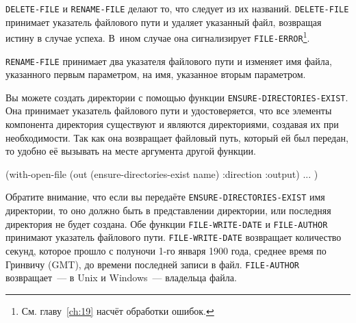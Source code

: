 \lstinline{DELETE-FILE} и \lstinline{RENAME-FILE} делают то, что следует из их
названий. \lstinline{DELETE-FILE} принимает указатель файлового пути и удаляет указанный файл,
возвращая истину в случае успеха. В~ином случае она сигнализирует
\lstinline{FILE-ERROR}\footnote{См. главу~\ref{ch:19} насчёт обработки ошибок.}\hspace{\footnotenegspace}.

\lstinline{RENAME-FILE} принимает два указателя файлового пути и изменяет имя файла, указанного
первым параметром, на имя, указанное вторым параметром.

Вы можете создать директории с помощью функции \lstinline{ENSURE-DIRECTORIES-EXIST}. Она
принимает указатель файлового пути и удостоверяется, что все элементы компонента
директория существуют и являются директориями, создавая их при необходимости. Так как она
возвращает файловый путь, который ей был передан, то удобно её вызывать на месте аргумента
другой функции.

\begin{myverb}
(with-open-file (out (ensure-directories-exist name) :direction :output) 
   ... 
   ) 
\end{myverb}

Обратите внимание, что если вы передаёте \lstinline{ENSURE-DIRECTORIES-EXIST} имя директории,
то оно должно быть в представлении директории, или последняя директория не будет
создана. Обе функции \lstinline{FILE-WRITE-DATE} и \lstinline{FILE-AUTHOR} принимают указатель
файлового пути. \lstinline{FILE-WRITE-DATE} возвращает количество секунд, которое прошло с
полуночи 1-го января 1900 года, среднее время по Гринвичу (GMT), до времени последней
записи в файл. \lstinline{FILE-AUTHOR} возвращает~--- в Unix и Windows~--- владельца
файла.

